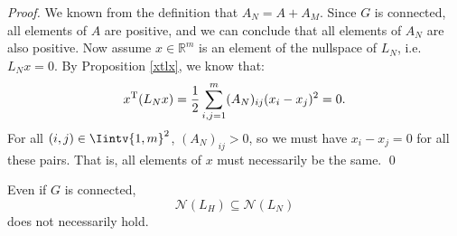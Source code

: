 \begin{proof}
   We known from the definition that $A_N = A + A_M$.
   Since $G$ is connected, all elements of $A$ are positive, and we can conclude that all elements of $A_N$ are also positive.
   Now assume $x \in \mathbb R ^{m}$ is an element of the nullspace of $L_N$, i.e. $L_N x = 0$.
   By Proposition \vref{xtlx}, we know that:
   \begin{equation*}
      x^{\rm T} (L_N x) = \frac{1}{2} \sum_{i,j=1}^m (A_N)_{ij} (x_i - x_j)^2 = 0.
   \end{equation*}
   For all $(i,j) \in \Iintv{1,m}^2$, $(A_N)_{ij} > 0$, so we must have $x_i - x_j = 0$ for all these pairs.
   That is, all elements of $x$ must necessarily be the same. \qed
\end{proof}

\begin{proposition} \label{spanOfLh}
   Even if $G$ is connected, 
   \begin{equation}
      \mathcal N (L_H) \subseteq \mathcal N (L_N)
   \end{equation}
   does not necessarily hold.
\end{proposition}

